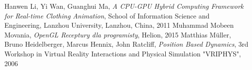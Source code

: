 \begin{thebibliography}{999}

 Hanwen Li, Yi Wan, Guanghui Ma, \emph{A CPU-GPU Hybrid Computing Framework for Real-time Clothing Animation}, School of Information Science and Engineering, Lanzhou University, Lanzhou, China, 2011
 Muhammad Mobeen Movania, \emph{OpenGL Receptury dla programisty}, Helion, 2015
 Matthias Müller, Bruno Heidelberger, Marcus Hennix, John Ratcliff, \emph{Position Based Dynamics}, 3rd Workshop in Virtual Reality Interactions and Physical Simulation "VRIPHYS", 2006

\end{thebibliography}
